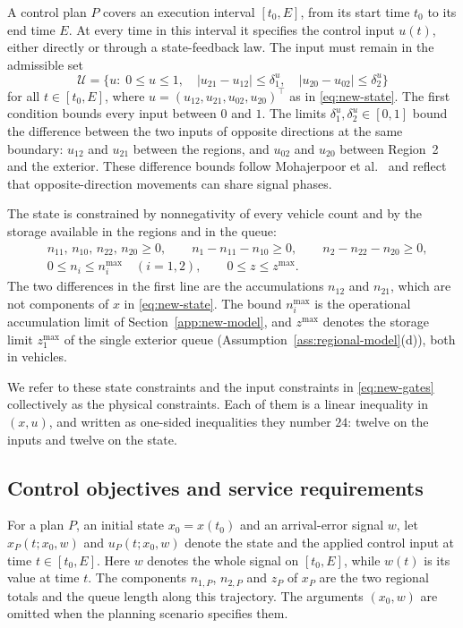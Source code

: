 \documentclass[final]{cas-sc}
\theoremstyle{definition}
\theoremstyle{plain}
\theoremstyle{definition}
\theoremstyle{plain}
\begin{document}
A control plan $P$ covers an execution interval $[t_0,E]$, from its
start time $t_0$ to its end time $E$. At every time in this interval it
specifies the control input $u(t)$, either directly or through a
state-feedback law. The input must remain in the admissible set
\begin{equation}
\mathcal U=\big\{u:\;0\le u\le1,\quad
|u_{21}-u_{12}|\le\delta_1^u,\quad
|u_{20}-u_{02}|\le\delta_2^u\big\}
\label{eq:new-gates}
\end{equation}
for all $t\in[t_0,E]$, where $u=(u_{12},u_{21},u_{02},u_{20})^\top$ as
in \eqref{eq:new-state}. The first condition bounds every input
between $0$ and $1$. The limits $\delta_1^u,\delta_2^u\in[0,1]$ bound
the difference between the two inputs of opposite directions at the
same boundary: $u_{12}$ and $u_{21}$ between the regions, and $u_{02}$
and $u_{20}$ between Region~2 and the exterior. These difference bounds
follow Mohajerpoor et al.~\cite{mohajerpoor2020hinf} and reflect that
opposite-direction movements can share signal phases.

The state is constrained by nonnegativity of every vehicle count and by
the storage available in the regions and in the queue:
\[
\begin{aligned}
&n_{11},\,n_{10},\,n_{22},\,n_{20}\ge0,\qquad
n_1-n_{11}-n_{10}\ge0,\qquad n_2-n_{22}-n_{20}\ge0,\\
&0\le n_i\le n_i^{\max}\quad(i=1,2),\qquad 0\le z\le z^{\max}.
\end{aligned}
\]
The two differences in the first line are the accumulations $n_{12}$
and $n_{21}$, which are not components of $x$ in
\eqref{eq:new-state}. The bound $n_i^{\max}$ is the operational
accumulation limit of Section~\ref{app:new-model}, and $z^{\max}$
denotes the storage limit $z_1^{\max}$ of the single exterior queue
(Assumption~\ref{ass:regional-model}(d)), both in vehicles.

We refer to these state constraints and the input constraints in
\eqref{eq:new-gates} collectively as the physical constraints. Each of
them is a linear inequality in $(x,u)$, and written as one-sided
inequalities they number $24$: twelve on the inputs and twelve on the
state.

\subsection{Control objectives and service requirements}
\label{sec:benchmark-formulation}

For a plan $P$, an initial state $x_0=x(t_0)$ and an arrival-error
signal $w$, let $x_P(t;x_0,w)$ and $u_P(t;x_0,w)$ denote the state and
the applied control input at time $t\in[t_0,E]$. Here $w$ denotes the
whole signal on $[t_0,E]$, while $w(t)$ is its value at time $t$. The
components $n_{1,P}$, $n_{2,P}$ and $z_P$ of $x_P$ are the two regional
totals and the queue length along this trajectory. The arguments
$(x_0,w)$ are omitted when the planning scenario specifies them.
\end{document}
